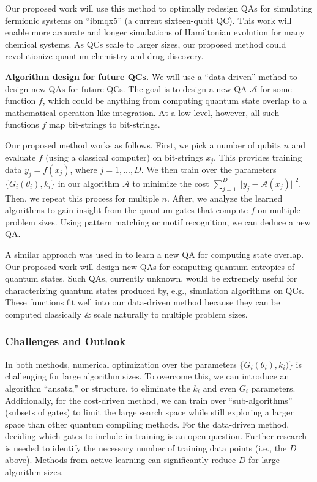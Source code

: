 \documentclass[10pt]{article}
\begin{document}
Our proposed work will use this method to optimally redesign QAs for simulating fermionic systems on ``ibmqx5'' (a current sixteen-qubit QC). This work will enable more accurate and longer simulations of Hamiltonian evolution for many chemical systems. As QCs scale to larger sizes, our proposed method could revolutionize quantum chemistry and drug discovery.

\textbf{Algorithm design for future QCs.} We will use a ``data-driven'' method to design new QAs for future QCs. The goal is to design a new QA $\mathcal{A}$ for some function $f$, which could be anything from computing quantum state overlap to a mathematical operation like integration. At a low-level, however, all such functions $f$ map bit-strings to bit-strings. %

Our proposed method works as follows. First, we pick a number of qubits $n$ and evaluate $f$ (using a classical computer) on bit-strings $x_j$. This provides training data $y_j = f(x_j)$, where $j = 1, ..., D$. We then train over the parameters $\{G_i(\theta_i), k_i\}$ in our algorithm $\mathcal{A}$ to minimize the cost $\sum_{j = 1}^{D} ||y_j - \mathcal{A}(x_j)||^2$. Then, we repeat this process for multiple $n$. After, we analyze the learned algorithms to gain insight from the quantum gates that compute $f$ on multiple problem sizes. Using pattern matching or motif recognition, we can deduce a new QA.

A similar approach was used in \cite{Cincio2018} to learn a new QA for computing state overlap. Our proposed work will design new QAs for computing quantum entropies of quantum states. Such QAs, currently unknown, would be extremely useful for characterizing quantum states produced by, e.g., simulation algorithms on QCs. These functions fit well into our data-driven method because they can be computed classically \& scale naturally to multiple problem sizes. %

\subsubsection{Challenges and Outlook} 
In both methods, numerical optimization over the parameters $\{G_i(\theta_i), k_i)\}$ is challenging for large algorithm sizes. To overcome this, we can introduce an algorithm ``ansatz,'' or structure, to eliminate the $k_i$ and even $G_i$ parameters. Additionally, for the cost-driven method, we can train over ``sub-algorithms'' (subsets of gates) to limit the large search space while still exploring a larger space than other quantum compiling methods. %
For the data-driven method, deciding which gates to include in training is an open question. Further research is needed to identify the necessary number of training data points (i.e., the $D$ above). Methods from active learning can significantly reduce $D$ for large algorithm sizes.
\end{document}
